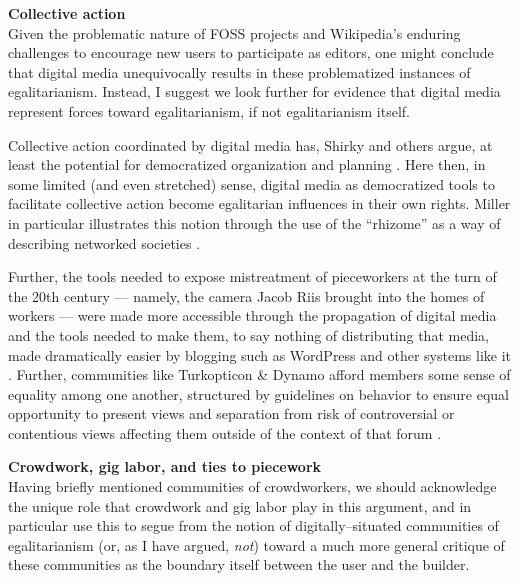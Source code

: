 \documentclass[11pt,titlepage]{article}
\newcommand{\sectitle}[1]{\textbf{#1}\\}
\begin{document}
\sectitle{Collective action}
Given the problematic nature of FOSS projects
and Wikipedia's enduring challenges to encourage new users to participate as editors,
one might conclude that
digital media unequivocally results in these problematized instances of egalitarianism.
Instead, I suggest we look further for evidence that
digital media represent forces toward egalitarianism, if not egalitarianism itself.

Collective action coordinated by digital media has,
Shirky and others argue,
at least the potential for democratized organization and planning
\cite{shirky2008here,costanza2014out}.
Here then, in some limited (and even stretched) sense,
digital media as democratized tools to facilitate collective action become
egalitarian influences in their own rights.
Miller in particular illustrates this notion through the use of the ``rhizome''
as a way of describing networked societies
\cite{miller2011understanding}.

Further, the tools needed to expose mistreatment of pieceworkers at the turn of the 20th century
--- namely, the camera Jacob Riis brought into the homes of workers ---
were made more accessible through the propagation of digital media and the tools needed to make them,
to say nothing of distributing that media,
made dramatically easier by blogging such as WordPress and other systems like it
\cite{riis2004other,facesOfMechanicalTurk}.
Further,
communities like Turkopticon \& Dynamo afford members some sense of equality among one another,
structured by guidelines on behavior to ensure equal opportunity to present views and
separation from risk of controversial or contentious views affecting them
outside of the context of that forum
\cite{turkopticon,dynamo}.















\sectitle{Crowdwork, gig labor, and ties to piecework}
Having briefly mentioned communities of crowdworkers,
we should acknowledge the unique role that crowdwork and gig labor play in this argument,
and in particular use this to segue from the notion of digitally--situated communities of egalitarianism
(or, as I have argued, \textit{not}) toward a much more general critique of
these communities as the boundary itself between the user and the builder.
\end{document}
